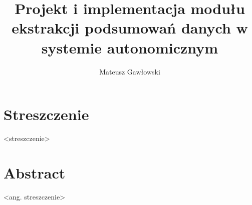 \documentclass[inzynier,druk]{dyplom}
\author{Mateusz Gawłowski}
\title{Projekt i implementacja modułu ekstrakcji podsumowań danych w systemie autonomicznym}
\makeatletter
\renewcommand*{\listof}[2]{%
  \@ifundefined{ext@#1}{\float@error{#1}}{%
    \expandafter\let\csname l@#1\endcsname \l@figure  %
    \float@listhead{#2}%
    \begingroup
      \setlength\parskip{0pt plus 1pt}%
      \@starttoc{\@nameuse{ext@#1}}%
    \endgroup}}
\makeatother
\begin{document}
\maketitle

\tableofcontents




\chapter*{Streszczenie} %
<streszczenie>


\begingroup
\renewcommand{\cleardoublepage}{}
\renewcommand{\clearpage}{}
\chapter*{Abstract} %

<ang. streszczenie>

\endgroup
{}















\end{document}
